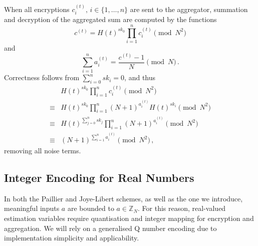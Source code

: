 \documentclass[10pt,letterpaper,oneside,twocolumn,journal]{IEEEtran}
\theoremstyle{definition}
\theoremstyle{definition}
\theoremstyle{remark}
\begin{document}
When all encryptions $c^{(t)}_{i},\,i\in\{1,\dots,n\}$ are sent to the aggregator, summation and decryption of the aggregated sum are computed by the functions
\begin{equation}
    c^{(t)} = H(t)^{sk_0}\prod^{n}_{i=1}c^{(t)}_{i} \pmod{N^2} \label{eqn:agg_summation}
\end{equation}
and
\begin{equation}
    \sum^{n}_{i=1}a^{(t)}_{i} = \frac{c^{(t)}-1}{N} \pmod{N}\,. \label{eqn:agg_decryption}
\end{equation}
Correctness follows from $\sum^{n}_{i=0}sk_i = 0$, and thus
\begin{equation*}
    \begin{split}
        &H(t)^{sk_0}\prod^{n}_{i=1}c^{(t)}_{i} \pmod{N^2} \\
        \equiv &H(t)^{sk_0}\prod^{n}_{i=1}(N+1)^{a^{(t)}_{i}} H(t)^{sk_i} \pmod{N^2} \\
        \equiv &H(t)^{\sum^n_{j=0}sk_j} \prod^{n}_{i=1}(N+1)^{a^{(t)}_{i}} \pmod{N^2} \\
        \equiv &(N+1)^{\sum^n_{i=1}a^{(t)}_{i}} \pmod{N^2}\,,
    \end{split}
\end{equation*}
removing all noise terms.

% 
% 

\subsection{Integer Encoding for Real Numbers} \label{subsec:encoding}
In both the Paillier and Joye-Libert schemes, as well as the one we introduce, meaningful inputs $a$ are bounded to $a \in \mathbb{Z}_N$. For this reason, real-valued estimation variables require quantisation and integer mapping for encryption and aggregation. We will rely on a generalised Q number encoding \cite{oberstarFixedPointRepresentationFractional2007} due to implementation simplicity and applicability.
\end{document}
